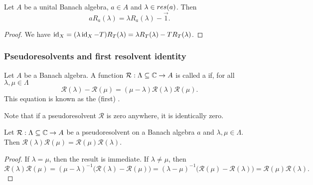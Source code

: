 \begin{lemma} \label{BanachAlgebraResolventMultiplication}
Let $A$ be a unital Banach algebra, $a\in A$ and $\lambda\in\\res(a)$. Then
\[ aR_a(\lambda) = \lambda R_a(\lambda) - \vec{1}. \]
\end{lemma}
\begin{proof}
We have $\operatorname{id}_X = (\lambda \operatorname{id}_X - T)R_T(\lambda) = \lambda R_T(\lambda) - TR_T(\lambda)$.
\end{proof}

\subsubsection{Pseudoresolvents and first resolvent identity}
\begin{definition}
Let $A$ be a Banach algebra. A function $\mathcal{R}:\Lambda \subseteq \mathbb{C} \to A$ is called a  if, for all $\lambda,\mu\in\Lambda$
\[ \mathcal{R}(\lambda) - \mathcal{R}(\mu) = (\mu-\lambda)\mathcal{R}(\lambda)\mathcal{R}(\mu). \]
This equation is known as the (first) .
\end{definition}

Note that if a pseudoresolvent $\mathcal{R}$ is zero anywhere, it is identically zero.

\begin{lemma}
Let $\mathcal{R}:\Lambda \subseteq \mathbb{C} \to A$ be a pseudoresolvent on a Banach algebra $a$ and $\lambda,\mu\in\Lambda$. Then $\mathcal{R}(\lambda)\mathcal{R}(\mu) = \mathcal{R}(\mu)\mathcal{R}(\lambda)$.
\end{lemma}
\begin{proof}
If $\lambda = \mu$, then the result is immediate. If $\lambda \neq \mu$, then
\[ \mathcal{R}(\lambda)\mathcal{R}(\mu) = (\mu-\lambda)^{-1}\big(\mathcal{R}(\lambda) - \mathcal{R}(\mu)\big) = (\lambda - \mu)^{-1}\big(\mathcal{R}(\mu) - \mathcal{R}(\lambda)\big) = \mathcal{R}(\mu)\mathcal{R}(\lambda). \]
\end{proof}

